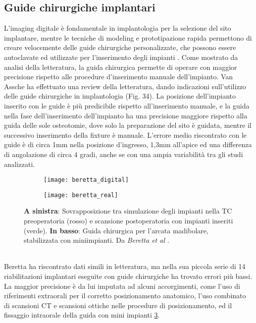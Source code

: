 \subsection{Guide chirurgiche implantari}
L'imaging digitale è fondamentale in implantologia per la selezione del sito implantare, mentre le tecniche di modeling e prototipazione rapida permettono di creare velocemente delle guide chirurgiche personalizzate, che possono essere autoclavate ed utilizzate per l'inserimento degli impianti \parencite{Reference83}. Come mostrato da analisi della letteratura, la guida chirurgica permette di operare con maggior precisione rispetto alle procedure d'inserimento manuale dell'impianto. Van Assche \parencite{Reference105} ha effettuato una review della letteratura, dando indicazioni sull'utilizzo delle guide chirurgiche in implantologia (Fig. 34). La posizione dell'impianto inserito con le guide è più predicibile rispetto all'inserimento manuale, e la guida nella fase dell'inserimento dell'impianto ha una precisione maggiore rispetto alla guida delle sole osteotomie, dove solo la preparazione del sito è guidata, mentre il successivo inserimento della fixture è manuale. L'errore medio riscontrato con le guide è di circa 1mm nella posizione d'ingresso, 1,3mm all'apice ed una differenza di angolazione di circa 4 gradi, anche se con una ampia variabilità tra gli studi analizzati.
\begin{figure}[h!]
 
\begin{subfigure}{0.5\textwidth}
\centering
\texttt{[image: beretta\_digital]} 
\label{fig:beretta_digital}
\end{subfigure}
\begin{subfigure}{0.5\textwidth}
\centering
\texttt{[image: beretta\_real]}
\label{fig:beretta_real}
\end{subfigure}

 
\caption{\textbf{A sinistra}: Sovrapposizione tra simulazione degli impianti nella TC preoperatoria (rosso) e scansione postoperatoria con impianti inseriti (verde). \textbf{In basso}: Guida chirurgica per l'arcata madibolare, stabilizzata con miniimpianti. Da \emph{Beretta et al} \parencite{Reference104}.}
\label{fig:Beretta}
\end{figure}
\\
Beretta \parencite{Reference104} ha riscontrato dati simili in letteratura, ma nella sua piccola serie di 14 riabilitazioni implantari eseguite con guide chirurgiche ha trovato errori più bassi. La maggior precisione è da lui imputata ad alcuni accorgimenti, come l'uso di riferimenti extraorali per il corretto posizionamento anatomico, l'uso combinato di scansioni CT e scansioni ottiche nelle procedure di posizionamento, ed il fissaggio intraorale della guida con mini impianti \ref{fig:Beretta}.\\
